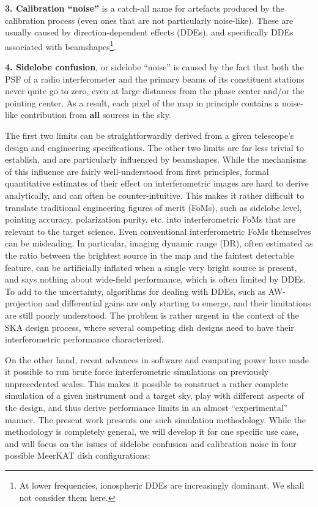 \documentclass{aa}
\begin{document}
{\bf 3. Calibration ``noise''} is a catch-all name for artefacts produced by the calibration process (even ones that are not particularly noise-like). These are usually caused by direction-dependent effects (DDEs), and specifically DDEs associated with beamshapes\footnote{At lower frequencies, ionospheric DDEs are increasingly dominant. We shall not consider them here.}.

{\bf 4. Sidelobe confusion}, or sidelobe ``noise'' is caused by the fact that both the PSF of a radio interferometer and the primary beams of its constituent stations never quite go to zero, even at large distances from 
the phase center and/or the pointing center. As a result, each pixel of the map in principle contains a noise-like contribution from {\bf all} sources in the sky.

The first two limits can be straightforwardly derived from a given telescope's design and engineering specifications. The other two limits are far less trivial to establish, and are particularly influenced by beamshapes. While the mechanisms of this influence are fairly well-understood from first principles, formal quantitative estimates of their effect on interferometric images are hard to derive analytically, and can often be counter-intuitive. This makes it rather difficult to translate traditional engineering figures of merit (FoMs), such as sidelobe level, pointing accuracy, polarization purity, etc. into interferometric FoMs that are relevant to the target science. Even conventional interferometric FoMs themselves can be misleading. In particular, imaging dynamic range (DR), often estimated as the ratio between the brightest source in the map and the faintest detectable feature, can be artificially inflated when a single very bright source is present, and says nothing about wide-field  performance, which is often limited by DDEs. To add to the uncertainty, algorithms for dealing with DDEs, such as AW-projection \citep{SB:imageplane} and differential gains \citep{RRIME3} are only starting to emerge, and their limitations are still poorly understood. The problem is rather urgent in the context of the SKA design process, where several competing dish designs need to have their interferometric performance characterized.

On the other hand, recent advances in software and computing power have made it possible to run brute force interferometric simulations on previously unprecedented scales. This makes it possible to construct a rather complete simulation of a given instrument and a target sky, play with different aspects of the design, and thus derive performance limits in an almost ``experimental'' manner. The present work presents one such simulation methodology. While the methodology is completely general, we will develop it for one specific use case, and will focus on the issues of sidelobe confusion and calibration noise in four possible MeerKAT dish configurations:
\end{document}
